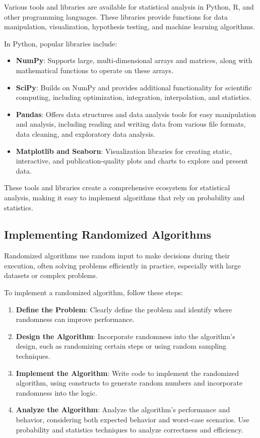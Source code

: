 \documentclass[12pt]{book} %
\begin{document}
Various tools and libraries are available for statistical analysis in Python, R, and other programming languages. These libraries provide functions for data manipulation, visualization, hypothesis testing, and machine learning algorithms.

In Python, popular libraries include:

\begin{itemize}
    \item \textbf{NumPy}: Supports large, multi-dimensional arrays and matrices, along with mathematical functions to operate on these arrays.
    \item \textbf{SciPy}: Builds on NumPy and provides additional functionality for scientific computing, including optimization, integration, interpolation, and statistics.
    \item \textbf{Pandas}: Offers data structures and data analysis tools for easy manipulation and analysis, including reading and writing data from various file formats, data cleaning, and exploratory data analysis.
    \item \textbf{Matplotlib and Seaborn}: Visualization libraries for creating static, interactive, and publication-quality plots and charts to explore and present data.
\end{itemize}

These tools and libraries create a comprehensive ecosystem for statistical analysis, making it easy to implement algorithms that rely on probability and statistics.

\subsection{Implementing Randomized Algorithms}

Randomized algorithms use random input to make decisions during their execution, often solving problems efficiently in practice, especially with large datasets or complex problems.

To implement a randomized algorithm, follow these steps:

\begin{enumerate}
    \item \textbf{Define the Problem}: Clearly define the problem and identify where randomness can improve performance.
    \item \textbf{Design the Algorithm}: Incorporate randomness into the algorithm's design, such as randomizing certain steps or using random sampling techniques.
    \item \textbf{Implement the Algorithm}: Write code to implement the randomized algorithm, using constructs to generate random numbers and incorporate randomness into the logic.
    \item \textbf{Analyze the Algorithm}: Analyze the algorithm's performance and behavior, considering both expected behavior and worst-case scenarios. Use probability and statistics techniques to analyze correctness and efficiency.
\end{enumerate}
\end{document}
